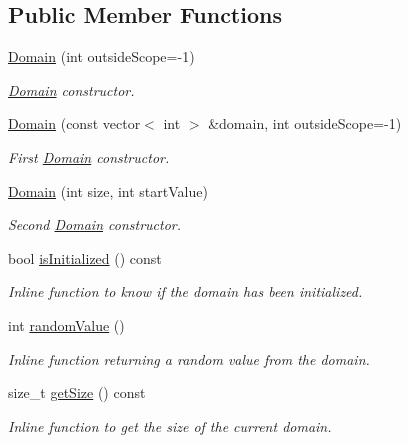 \subsection*{Public Member Functions}
\begin{DoxyCompactItemize}
\item 
\hyperlink{classghost_1_1Domain_a48bfae90d7dbb6d8e1a3afdd8e471e4f}{Domain} (int outside\+Scope=-\/1)
\begin{DoxyCompactList}\small\item\em \hyperlink{classghost_1_1Domain}{Domain} constructor. \end{DoxyCompactList}\item 
\hyperlink{classghost_1_1Domain_a5277f6bd2940a87b4784834e93cb53c9}{Domain} (const vector$<$ int $>$ \&domain, int outside\+Scope=-\/1)
\begin{DoxyCompactList}\small\item\em First \hyperlink{classghost_1_1Domain}{Domain} constructor. \end{DoxyCompactList}\item 
\hyperlink{classghost_1_1Domain_a6a9f7b0aec78acb0b0f4edefaea7a6e9}{Domain} (int size, int start\+Value)
\begin{DoxyCompactList}\small\item\em Second \hyperlink{classghost_1_1Domain}{Domain} constructor. \end{DoxyCompactList}\item 
bool \hyperlink{classghost_1_1Domain_a1ead2b1ccee560dac9ddb68c15362511}{is\+Initialized} () const 
\begin{DoxyCompactList}\small\item\em Inline function to know if the domain has been initialized. \end{DoxyCompactList}\item 
int \hyperlink{classghost_1_1Domain_ae2ab236c8382d3f541d0f4db44d2b625}{random\+Value} ()
\begin{DoxyCompactList}\small\item\em Inline function returning a random value from the domain. \end{DoxyCompactList}\item 
size\+\_\+t \hyperlink{classghost_1_1Domain_ac84d289fcf22d1d67e545389e7a9de84}{get\+Size} () const 
\begin{DoxyCompactList}\small\item\em Inline function to get the size of the current domain. \end{DoxyCompactList}\item 

\end{DoxyCompactItemize}
